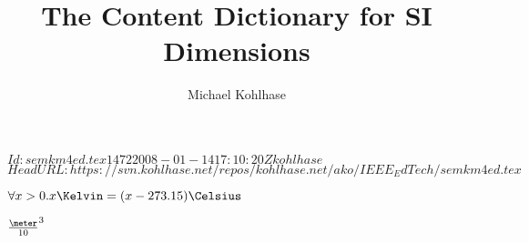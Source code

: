 \documentclass[twoside]{article}
\title{The Content Dictionary for SI Dimensions}
\author{Michael Kohlhase}
\begin{document}
\svnInfo $Id: semkm4ed.tex 1472 2008-01-14 17:10:20Z kohlhase $
\svnKeyword $HeadURL: https://svn.kohlhase.net/repos/kohlhase.net/ako/IEEE_EdTech/semkm4ed.tex $
\maketitle

\begin{module}[id=units]

\begin{symboldec}[name=gram]
\end{symboldec}

\begin{symboldec}[name=meter]
\end{symboldec}

\begin{symboldec}[name=second]
\end{symboldec}

\begin{symboldec}[name=Volt]
\end{symboldec}

\begin{symboldec}[name=Kelvin]
\end{symboldec}

\begin{symboldec}[name=Celsius]
\end{symboldec}
  
  \begin{definition}[for=Celsius,type=implicit]
    $\forall x>0.x\Kelvin=(x-273.15)\Celsius$
  \end{definition}

  \begin{symboldec}[name=liter]
  \end{symboldec}
  
  \begin{definition}[for=liter,type=simple]
    ${\meter\over10}^3$
  \end{definition}
\end{module}
\end{document}
